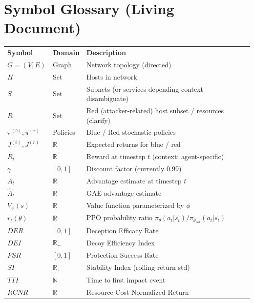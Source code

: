 \section*{Symbol Glossary (Living Document)}
\begin{tabular}{llp{8cm}}
\textbf{Symbol} & \textbf{Domain} & \textbf{Description} \\
$G=(V,E)$ & Graph & Network topology (directed) \\
$H$ & Set & Hosts in network \\
$S$ & Set & Subnets (or services depending context – disambiguate) \\
$R$ & Set & Red (attacker-related) host subset / resources (clarify) \\
$\pi^{(b)},\pi^{(r)}$ & Policies & Blue / Red stochastic policies \\
$J^{(b)},J^{(r)}$ & $\mathbb{R}$ & Expected returns for blue / red \\
$R_t$ & $\mathbb{R}$ & Reward at timestep $t$ (context: agent-specific) \\
$\gamma$ & $[0,1]$ & Discount factor (currently 0.99) \\
$A_t$ & $\mathbb{R}$ & Advantage estimate at timestep $t$ \\
$\hat{A}_t$ & $\mathbb{R}$ & GAE advantage estimate \\
$V_{\phi}(s)$ & $\mathbb{R}$ & Value function parameterized by $\phi$ \\
$r_t(\theta)$ & $\mathbb{R}$ & PPO probability ratio \(\pi_\theta(a_t|s_t)/\pi_{\theta_{old}}(a_t|s_t)\) \\
$DER$ & $[0,1]$ & Deception Efficacy Rate \\
$DEI$ & $\mathbb{R}_+$ & Decoy Efficiency Index \\
$PSR$ & $[0,1]$ & Protection Success Rate \\
$SI$ & $\mathbb{R}_+$ & Stability Index (rolling return std) \\
$TTI$ & $\mathbb{N}$ & Time to first impact event \\
$RCNR$ & $\mathbb{R}$ & Resource Cost Normalized Return \\
\end{tabular}

